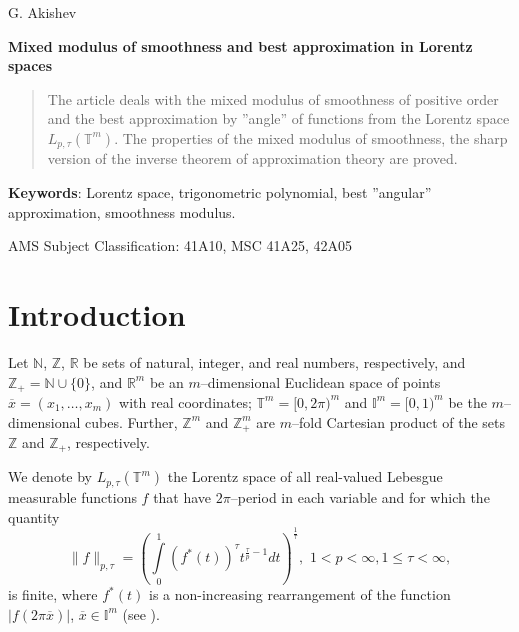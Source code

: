 \documentclass[12pt]{article}
\theoremstyle{plain}
\begin{document}
\pagestyle{myheadings}
\thispagestyle{empty}

\begin{center}
{\sc G. Akishev}
\end{center}


\begin{center}
{\bf Mixed modulus of smoothness and best approximation in Lorentz spaces
}
\end{center}

\vspace*{0.2 cm}

\begin{quote}
The article deals with the mixed modulus of smoothness of positive order and the best approximation by ''angle'' of functions from the Lorentz space $L_{p, \tau}(\mathbb{T}^{m})$. The properties of the mixed modulus of smoothness, the sharp version of the inverse theorem of approximation theory are proved.
\end{quote}

\textbf{Keywords}: Lorentz space, trigonometric polynomial, best ''angular'' approximation,
smoothness modulus.

AMS Subject Classification: 41A10, MSC 41A25, 42A05

\vspace*{0.2 cm}

\section*{Introduction} 

Let $\mathbb{N}$, $\mathbb{Z}$, $\mathbb{R}$ be sets of natural, integer, and real numbers, respectively, and $\mathbb{Z}_{+} = \mathbb{N }\cup\{0\}$, and $\mathbb{R}^{m}$ be an $m$--dimensional Euclidean space of points $\overline{x}=(x_{1},\ldots,x_{m})$ with real coordinates;
$\mathbb{T}^{m}=[0, 2\pi)^{m}$ and $\mathbb{I}^{m}=[0, 1)^{m}$ be the $m $--dimensional cubes. Further, $\mathbb{Z}^{m}$ and $\mathbb{Z}_{+}^{m}$ are $m$--fold Cartesian product of the sets $\mathbb{Z}$ and $\mathbb{Z}_{+}$, respectively.

 \smallskip
We denote by $L_{p,\tau}(\mathbb{T}^{m})$
the Lorentz space of all real-valued Lebesgue measurable functions $f$ that have $2\pi$--period in each variable and for which the quantity
\begin{equation*}
\|f\|_{p,\tau} = \left(\int\limits_{0}^{1}(f^{*}(t))^{\tau}t^{\frac{\tau}{p}-1}dt
\right)^{\frac{1}{\tau}} , \,\, 1<
p<\infty, 1\leqslant \tau <\infty,
\end{equation*}
is finite, where $f^{*}(t)$ is a non-increasing rearrangement of the function $|f(2\pi\overline{x})|$, $\overline{x} \in \mathbb{I}^{m }$ (see \cite[Ch.~1, sec. 3, P.~213--216]{22}).
\end{document}
